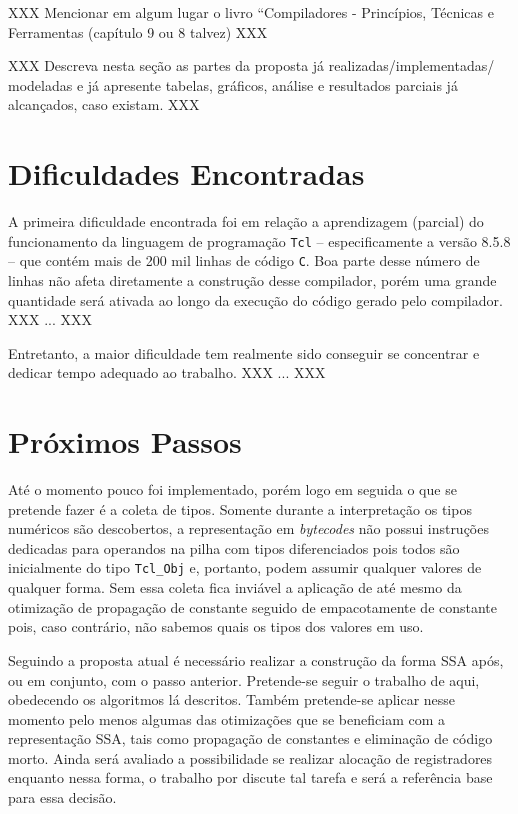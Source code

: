 XXX Mencionar em algum lugar o livro ``Compiladores - Princípios,
Técnicas e Ferramentas (capítulo 9 ou 8 talvez) XXX

XXX Descreva nesta seção as partes da proposta já realizadas/implementadas/
modeladas e já apresente tabelas, gráficos, análise e resultados parciais
já alcançados, caso existam. XXX


\section{Dificuldades Encontradas}

A primeira dificuldade encontrada foi em relação a aprendizagem
(parcial) do funcionamento da linguagem de programação \texttt{Tcl} --
especificamente a versão 8.5.8 --
que contém mais de 200 mil linhas de código \texttt{C}. Boa parte
desse número de linhas não afeta diretamente a construção desse
compilador, porém uma grande quantidade será ativada
ao longo da execução do código gerado pelo compilador. XXX ... XXX

Entretanto, a maior dificuldade tem realmente sido conseguir se
concentrar e dedicar tempo adequado ao trabalho. XXX ... XXX



\section{Próximos Passos}

Até o momento pouco foi implementado, porém logo em seguida o que se pretende
fazer é a coleta de tipos. Somente durante a interpretação os
tipos numéricos são descobertos, a representação em \textit{bytecodes}
não possui instruções dedicadas para operandos na pilha com tipos
diferenciados pois todos são inicialmente do tipo \verb!Tcl_Obj! e,
portanto, podem assumir qualquer valores de qualquer forma. Sem essa
coleta fica inviável a
aplicação de até mesmo da otimização de propagação de constante
seguido de empacotamente de constante pois, caso contrário, não
sabemos quais os tipos dos valores em uso.

Seguindo a proposta atual é necessário realizar a construção da forma
SSA após, ou em conjunto, com o passo anterior. Pretende-se seguir o
trabalho de  aqui, obedecendo os algoritmos lá
descritos. Também pretende-se aplicar nesse momento pelo menos algumas
das otimizações que se beneficiam com a representação SSA, tais como
propagação de constantes e eliminação de código morto. Ainda será
avaliado a possibilidade se realizar alocação de registradores
enquanto nessa forma, o trabalho por  discute
tal tarefa e será a referência base para essa decisão.

